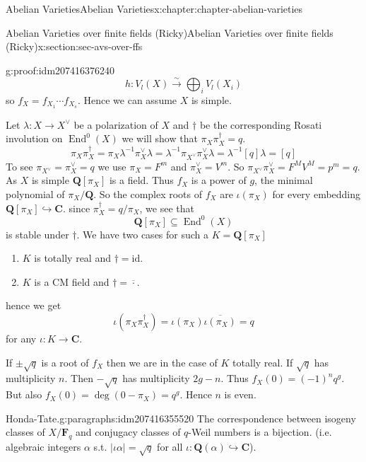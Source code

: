 \documentclass[oneside,10pt,]{book}
\numberwithin{equation}{section}
\newcommand{\lb}{[}
\newcommand{\rb}{]}
\newcommand{\QQ}{\mathbf{Q}}
\newcommand{\CC}{\mathbf{C}}
\newcommand{\FF}{\mathbf{F}}
\newcommand{\id}{\mathrm{id}}
\DeclareMathOperator{\End}{End}
\begin{document}
\begin{chapterptx}{Abelian Varieties}{}{Abelian Varieties}{}{}{x:chapter:chapter-abelian-varieties}
\begin{sectionptx}{Abelian Varieties over finite fields (Ricky)}{}{Abelian Varieties over finite fields (Ricky)}{}{}{x:section:sec-avs-over-ffs}
\begin{proofptx}{}{g:proof:idm207416376240}
\begin{equation*}
h\colon V_l(X)\xrightarrow{\sim} \bigoplus_i V_l(X_i)
\end{equation*}
so \(f_X = f_{X_1} \cdots f_{X_s}\). Hence we can assume \(X\) is simple.%
\par
Let \(\lambda \colon X \to X^\vee\) be a polarization of \(X\) and \(\dagger\) be the corresponding Rosati involution on \(\End^0(X)\) we will show that \(\pi_X\pi_X^\dagger = q\).%
\begin{equation*}
\pi_X \pi_X^\dagger = \pi_X \lambda^{-1} \pi_X^\vee \lambda = \lambda^{-1} \pi_{X^\vee} \pi_X^\vee \lambda = \lambda^{-1} \lb q \rb \lambda = \lb q \rb
\end{equation*}
To see \(\pi_{X^\vee} = \pi_X^\vee = q\) we use \(\pi_X = F^m\) and \(\pi_X^\vee = V^m \). So \(\pi_{X^\vee} \pi_X^\vee = F^MV^M = p^m = q\). As \(X\) is simple \(\QQ\lb \pi_X\rb\) is a field. Thus \(f_X\) is a power of \(g\), the minimal polynomial of \(\pi_X/\QQ\). So the complex roots of \(f_X\) are \(\iota(\pi_X)\)  for every embedding \(\QQ\lb \pi_X\rb\hookrightarrow \CC\). since \(\pi_X^\dagger = q/ \pi_X\), we see that%
\begin{equation*}
\QQ[\pi_X] \subseteq \End^0(X)
\end{equation*}
is stable under \(\dagger\). We have two cases for such a \(K = \QQ\lb \pi_X \rb \)%
\begin{enumerate}
\item{}\(K\) is  totally real and \(\dagger = \id\).%
\item{}\(K\) is a CM field and \(\dagger = \overline{\cdot}\).%
\end{enumerate}
hence we get%
\begin{equation*}
\iota(\pi_X\pi_X^\dagger) = \iota(\pi_X) \overline{\iota(\pi_X)} = q
\end{equation*}
for any \(\iota\colon K \to \CC\).%
\par
If \(\pm \sqrt q\) is  a root  of  \(f_X\) then we are in the case of \(K\) totally real. If \(\sqrt q\) has multiplicity \(n\). Then \(-\sqrt q\) has multiplicity \(2g-n\). Thus \(f_X(0) = (-1)^n   q^g\). But also \(f_X(0 ) = \deg(0 - \pi_X) = q^g\). Hence \(n \) is even.%
\end{proofptx}
\begin{paragraphs}{Honda-Tate.}{g:paragraphs:idm207416355520}%
The correspondence between isogeny classes of \(X/\FF_q\) and conjugacy classes of \(q\)-Weil numbers is a bijection. (i.e. algebraic integers \(\alpha\) s.t. \(|\iota \alpha| = \sqrt q\) for all \(\iota \colon \QQ(\alpha) \hookrightarrow \CC\)).%

\end{paragraphs}
\end{sectionptx}
\end{chapterptx}
\end{document}
